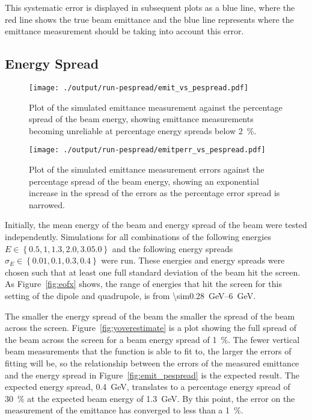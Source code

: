 This systematic error is displayed in subsequent plots as a blue line, where the
red line shows the true beam emittance and the blue line represents where the
emittance measurement should be taking into account this error.

\subsection{Energy Spread}

\begin{figure*}[!t]
	\begin{minipage}[b]{\columnwidth}
		\centering
		\texttt{[image: ./output/run-pespread/emit\_vs\_pespread.pdf]}
		\caption{
			Plot of the simulated emittance measurement against the percentage
			spread of the beam energy, showing emittance measurements becoming
			unreliable at percentage energy spreads below \SI{2}{\percent}.
		}
		\label{fig:emit_pespread}
	\end{minipage}\hfill
	\begin{minipage}[b]{\columnwidth}
		\centering
		\texttt{[image: ./output/run-pespread/emitperr\_vs\_pespread.pdf]}
		\caption{
			Plot of the simulated emittance measurement errors against the
			percentage spread of the beam energy, showing an exponential increase in
			the spread of the errors as the percentage error spread is narrowed.
		}
		\label{fig:emitperr_pespread}
	\end{minipage}
\end{figure*}

Initially, the mean energy of the beam and energy spread of the beam were tested
independently. Simulations for all combinations of the following energies \(E
\in \left\{ 0.5, 1, 1.3, 2.0, 3.0 5.0\right\} \) and the following energy
spreads \(\sigma_E \in \left\{ 0.01, 0.1, 0.3, 0.4 \right\}\) were run.  These
energies and energy spreads were chosen such that at least one full standard
deviation of the beam hit the screen. As Figure~\ref{fig:eofx} shows, the range
of energies that hit the screen for this setting of the dipole and quadrupole,
is from \SIrange{\sim0.28}{6}{\giga\electronvolt}.

The smaller the energy spread of the beam the smaller the spread of the beam
across the screen. Figure~\ref{fig:yoverestimate} is a plot showing the full
spread of the beam across the screen for a beam energy spread of
\SI{1}{\percent}. The fewer vertical beam measurements that the function is able
to fit to, the larger the errors of fitting will be, so the relationship between
the errors of the measured emittance and the energy spread in
Figure~\ref{fig:emit_pespread} is the expected result. The expected energy
spread, \SI{0.4}{\giga\electronvolt}, translates to a percentage energy spread
of \SI{30}{\percent} at the expected beam energy of
\SI{1.3}{\giga\electronvolt}. By this point, the error on the measurement of the
emittance has converged to less than a \SI{1}{\percent}.


